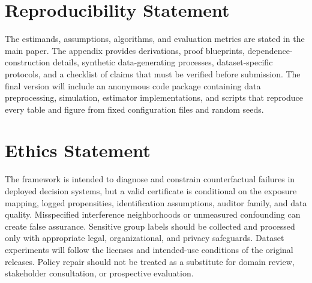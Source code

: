 \documentclass{article}
\theoremstyle{plain}
\theoremstyle{definition}
\theoremstyle{remark}
\begin{document}









\section*{Reproducibility Statement}
The estimands, assumptions, algorithms, and evaluation metrics are stated in the main paper. The appendix provides derivations, proof blueprints, dependence-construction details, synthetic data-generating processes, dataset-specific protocols, and a checklist of claims that must be verified before submission. The final version will include an anonymous code package containing data preprocessing, simulation, estimator implementations, and scripts that reproduce every table and figure from fixed configuration files and random seeds.

\section*{Ethics Statement}
The framework is intended to diagnose and constrain counterfactual failures in deployed decision systems, but a valid certificate is conditional on the exposure mapping, logged propensities, identification assumptions, auditor family, and data quality. Misspecified interference neighborhoods or unmeasured confounding can create false assurance. Sensitive group labels should be collected and processed only with appropriate legal, organizational, and privacy safeguards. Dataset experiments will follow the licenses and intended-use conditions of the original releases. Policy repair should not be treated as a substitute for domain review, stakeholder consultation, or prospective evaluation.






\appendix

\end{document}
